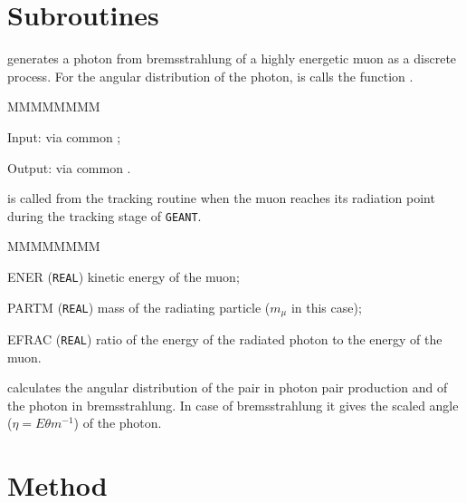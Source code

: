    
\section{Subroutines}
 generates a photon from bremsstrahlung of a highly 
energetic muon as a discrete process. For the 
angular distribution of the photon, is calls the function .

\begin{DLtt}{MMMMMMMM}
\item[Input:] via common ;
\item[Output:] via common .
\end{DLtt}
 
 is called from the tracking routine 
 when the muon reaches its radiation 
point during the tracking stage of {\tt GEANT}.


\begin{DLtt}{MMMMMMMM}
\item[ENER] ({\tt REAL}) kinetic energy of the muon;
\item[PARTM] ({\tt REAL}) mass of the radiating particle ($m_{\mu}$ in
this case);
\item[EFRAC] ({\tt REAL}) ratio of the energy of the radiated photon
to the energy of the muon.
\end{DLtt}

 calculates the angular distribution of the \Pem\Pep pair
in photon pair production and of the photon in bremsstrahlung.
In case of bremsstrahlung it gives the scaled angle ($\eta = E\theta
m^{-1}$) of the photon.

\section{Method}
 
